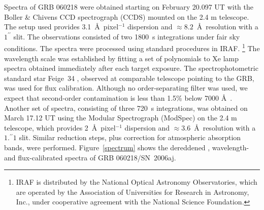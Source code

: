 \documentclass[apj]{emulateapj}
\begin{document}
Spectra of GRB 060218 were obtained starting on February 20.097 UT
with the Boller \& Chivens CCD spectrograph (CCDS)
mounted on the 2.4 m telescope. The setup used provides 
3.1~\AA\ pixel$^{-1}$ dispersion and $\approx 8.2$~\AA\
resolution with a $1^{\prime\prime}$ slit. The observations consisted of
two 1800~s integrations under fair sky conditions. 
The spectra were processed using standard procedures in IRAF.
\footnote{IRAF is distributed by the National Optical Astronomy Observatories,
    which are operated by the Association of Universities for Research
    in Astronomy, Inc., under cooperative agreement with the National
    Science Foundation.} The wavelength scale was established by fitting 
a set of polynomials to Xe lamp spectra obtained immediately after each target 
exposure.   The spectrophotometric standard star Feige~34 \citep{stone},
observed at comparable telescope pointing to the GRB, was used for
flux calibration.  Although no order-separating filter was used,
we expect that second-order contamination 
is less than 1.5\% below 7000 \AA\ \citep[e.g.,][]{izotov}.  
Another set of spectra, consisting of three 720~s integrations,
was obtained on March 17.12 UT using the Modular Spectrograph (ModSpec) 
on the 2.4 m telescope,
which provides 2~\AA\ pixel$^{-1}$ dispersion and $\approx 3.6$~\AA\ resolution
with a $1.\!^{\prime\prime}1$ slit.  
Similar reduction steps, plus correction for
atmospheric absorption bands, were performed.
Figure~\ref{spectrum} shows the dereddened \citep{cardelli},
wavelength- and flux-calibrated spectra of GRB 060218/SN~2006aj.
\end{document}
